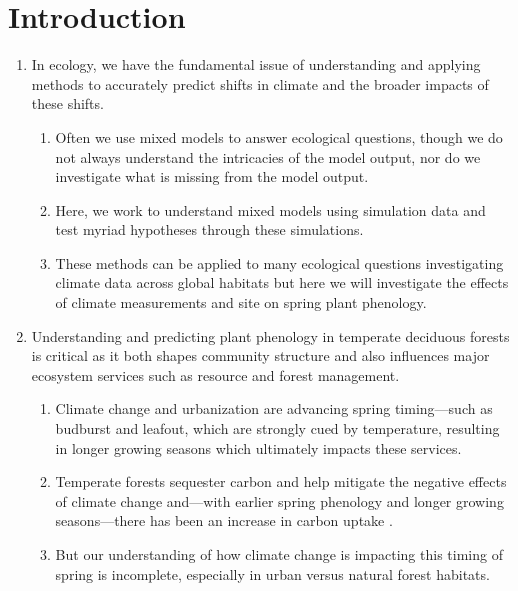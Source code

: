 \documentclass{article}\usepackage[]{graphicx}\usepackage[]{color}
\begin{document}
\section*{Introduction}
\begin{enumerate}
\item In ecology, we have the fundamental issue of understanding and applying methods to accurately predict shifts in climate and the broader impacts of these shifts.
  \begin{enumerate}
  \item Often we use mixed models to answer ecological questions, though we do not always understand the intricacies of the model output, nor do we investigate what is missing from the model output.
  \item Here, we work to understand mixed models using simulation data and test myriad hypotheses through these simulations. 
  \item These methods can be applied to many ecological questions investigating climate data across global habitats but here we will investigate the effects of climate measurements and site on spring plant phenology. 
  \end{enumerate}
  
\item Understanding and predicting plant phenology in temperate deciduous forests is critical as it both shapes community structure and also influences major ecosystem services such as resource and forest management. 
  \begin{enumerate} 
  \item Climate change and urbanization are advancing spring timing---such as budburst and leafout, which  are strongly cued by temperature, resulting in longer growing seasons \citep{Chuine2001} which ultimately impacts these services.  
  \item Temperate forests sequester carbon and help mitigate the negative effects of climate change and---with earlier spring phenology and longer growing seasons---there has been an increase in carbon uptake \citep{Keenan2014}.
  \item But our understanding of how climate change is impacting this timing of spring is incomplete, especially in urban versus natural forest habitats. 
  \end{enumerate}
  

\end{enumerate}
\end{document}
